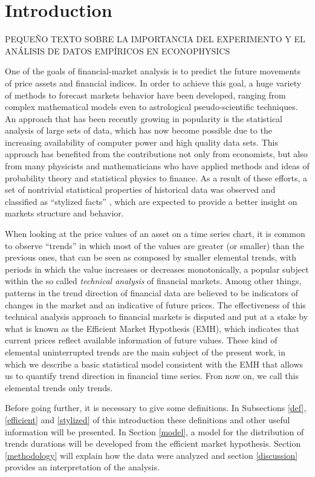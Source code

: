 \documentclass[a4paper]{jpconf}
\begin{document}
  \section{Introduction}
  \label{intro}
  PEQUEÑO TEXTO SOBRE LA IMPORTANCIA DEL EXPERIMENTO Y EL ANÁLISIS DE DATOS EMPÍRICOS EN ECONOPHYSICS
  
One of the goals of financial-market analysis is to predict the future movements of price assets and financial indices. In order to achieve this goal, a huge variety of methods to forecast markets behavior have been developed, ranging from complex mathematical models even to astrological pseudo-scientific techniques. An approach that has been recently growing in popularity is the statistical analysis of large sets of data, which has now become possible due to the increasing availability of computer power and high quality data sets. This approach has benefited from the contributions not only from economists, but also from many physicists and mathematicians who have applied methods and ideas of probability theory and statistical physics to finance. As a result of these efforts, a set of nontrivial statistical properties of historical data was observed and classified as ``stylized facts'' \cite{Rama}, which are expected to provide a better insight on markets structure and behavior.

When looking at the price values of an asset on a time series chart, it is common to observe ``trends'' in which most of the values are greater (or smaller) than the previous ones, that can be seen as composed by smaller elemental trends, with periods in which the value increases or decreases monotonically, a popular subject within the so called \emph{technical analysis} of financial markets. Among other things, patterns in the trend direction of financial data are believed to be indicators of changes in the market and an indicative of future prices. The effectiveness of this technical analysis approach to financial markets is disputed and put at a stake by what is known as the Efficient Market Hypothesis (EMH), which indicates that current prices reflect available information of future values. These kind of elemental uninterrupted trends are the main subject of the present work, in which we describe a basic statistical model consistent with the EMH that allows us to quantify trend direction in financial time series. Fron now on, we call this elemental trends only trends.

Before going further, it is necessary to give some definitions. In Subsections \ref{def}, \ref{efficient} and \ref{stylized} of this introduction these definitions and other useful information will be presented. In Section \ref{model}, a model for the distribution of trends durations will be developed from the efficient market hypothesis. Section \ref{methodology} will explain how the data were analyzed and section \ref{discussion} provides an interpretation of the analysis.
\end{document}
